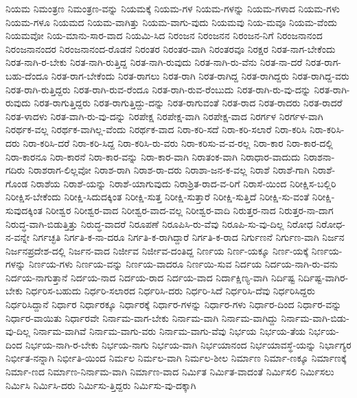 {ನಿಯಮ
ನಿಮಂತ್ರಣ
ನಿಮಂತ್ರಣ-ವನ್ನು
ನಿಯಮಕ್ಕೆ
ನಿಯಮ-ಗಳ
ನಿಯಮ-ಗಳನ್ನು
ನಿಯಮ-ಗಳಾದ
ನಿಯಮ-ಗಳು
ನಿಯಮ-ಗಳೂ
ನಿಯಮದ
ನಿಯಮ-ವಾಗಿತ್ತು
ನಿಯಮ-ವಾಗು-ವುದು
ನಿಯಮವು
ನಿಯ-ಮವೂ
ನಿಯಮ-ವೆಂದು
ನಿಯಮವೋ
ನಿಯ-ಮಾನು-ಸಾರ-ವಾದ
ನಿಯಮಿ-ಸಿದ
ನಿರಂಜನ
ನಿರಂಜನನ
ನಿರಂಜನ-ನಿಗೆ
ನಿರಂಜನಾನಂದ
ನಿರಂಜನಾನಂದರ
ನಿರಂಜನಾನಂದ-ರೊಡನೆ
ನಿರಂತರ
ನಿರಂತರ-ವಾಗಿ
ನಿರಂತರವೂ
ನಿರಕ್ಷರ
ನಿರತ-ನಾಗ-ಬೇಕೆಂದು
ನಿರತ-ನಾಗಿ-ರ-ಬೇಕು
ನಿರತ-ನಾಗಿ-ರುತ್ತಿದ್ದ
ನಿರತ-ನಾಗಿ-ರುವುದು
ನಿರತ-ನಾಗಿ-ರು-ವೆನು
ನಿರತ-ನಾ-ದರೆ
ನಿರತ-ರಾಗ-ಬಹು-ದೆಂದೂ
ನಿರತ-ರಾಗ-ಬೇಕೆಂದು
ನಿರತ-ರಾಗಲು
ನಿರತ-ರಾಗಿ
ನಿರತ-ರಾಗಿದ್ದ
ನಿರತ-ರಾಗಿದ್ದರು
ನಿರತ-ರಾಗಿದ್ದ-ವರು
ನಿರತ-ರಾಗಿ-ರುತ್ತಿದ್ದರು
ನಿರತ-ರಾಗಿ-ರುವ-ರೆಂದೂ
ನಿರತ-ರಾಗಿ-ರುವ-ರೆಂಬುದು
ನಿರತ-ರಾಗಿ-ರು-ವು-ದನ್ನು
ನಿರತ-ರಾಗಿ-ರುವುದು
ನಿರತ-ರಾಗುತ್ತಿದ್ದರು
ನಿರತ-ರಾಗುತ್ತಿದ್ದು-ದನ್ನು
ನಿರತ-ರಾಗುವಂತೆ
ನಿರತ-ರಾದ
ನಿರತ-ರಾದರು
ನಿರತ-ರಾದರೆ
ನಿರತ-ಳಾದಳು
ನಿರತ-ವಾಗಿ-ರು-ವು-ದನ್ನು
ನಿರಪೇಕ್ಷ
ನಿರಪೇಕ್ಷ-ವಾಗಿ
ನಿರಪೇಕ್ಷ-ವಾದ
ನಿರರ್ಗಳ
ನಿರರ್ಗಳ-ವಾಗಿ
ನಿರರ್ಥಕ-ವಲ್ಲ
ನಿರರ್ಥಕ-ವಾಗಿಲ್ಲ-ವೆಂದು
ನಿರರ್ಥಕ-ವಾದ
ನಿರಾ-ಕರಿ-ಸದೆ
ನಿರಾ-ಕರಿ-ಸಲಾರೆ
ನಿರಾ-ಕರಿಸಿ
ನಿರಾ-ಕರಿಸಿ-ದರು
ನಿರಾ-ಕರಿಸಿ-ದರೆ
ನಿರಾ-ಕರಿ-ಸಿದ್ದ
ನಿರಾ-ಕರಿಸಿ-ರು-ವರು
ನಿರಾ-ಕರಿಸು-ವ-ವ-ರಲ್ಲ
ನಿರಾ-ಕಾರ
ನಿರಾ-ಕಾರ-ದಲ್ಲಿ
ನಿರಾ-ಕಾರನೂ
ನಿರಾ-ಕಾರನೆ
ನಿರಾ-ಕಾರ-ವನ್ನು
ನಿರಾ-ಕಾರ-ವಾಗಿ
ನಿರಾತಂಕ-ವಾಗಿ
ನಿರಾಧಾರ-ವಾದುದು
ನಿರಾಶನಾ-ಗದಿರು
ನಿರಾಶರಾಗ-ಲಿಲ್ಲವೋ
ನಿರಾಶ-ರಾಗಿ
ನಿರಾಶ-ರಾ-ದರು
ನಿರಾಶಾ-ಜನ-ಕ-ವಲ್ಲ
ನಿರಾಶೆ
ನಿರಾಶೆ-ಗಾಗಿ
ನಿರಾಶೆ-ಗೊಂಡ
ನಿರಾಶೆಯ
ನಿರಾಶೆ-ಯನ್ನು
ನಿರಾಶೆ-ಯಾಗುವುದು
ನಿರಾಶ್ರಿತ-ರಾದ-ವ-ರಿಗೆ
ನಿರಾಸೆ-ಯಿಂದ
ನಿರೀಕ್ಷಿಸ-ಬಲ್ಲಿರಿ
ನಿರೀಕ್ಷಿಸ-ಬೇಕೆಂದು
ನಿರೀಕ್ಷಿ-ಸಿದುದಕ್ಕಿಂತ
ನಿರೀಕ್ಷಿ-ಸುತ್ತ
ನಿರೀಕ್ಷಿ-ಸುತ್ತಾರೆ
ನಿರೀಕ್ಷಿ-ಸುತ್ತಿದೆ
ನಿರೀಕ್ಷಿ-ಸು-ವಂತೆ
ನಿರೀಕ್ಷಿ-ಸುವುದಕ್ಕಿಂತ
ನಿರೀಶ್ವರ
ನಿರೀಶ್ವರ-ವಾದ
ನಿರೀಶ್ವರ-ವಾದ-ವಲ್ಲ
ನಿರೀಶ್ವರ-ವಾದಿ
ನಿರುತ್ತರ-ನಾದ
ನಿರುತ್ತರ-ನಾ-ದಾಗ
ನಿರುದ್ಧ-ವಾಗಿ-ಬಿಡುತ್ತಿತ್ತು
ನಿರುದ್ಧ-ವಾದರೆ
ನಿರೂಪಣೆ
ನಿರೂಪಿಸಿ-ರು-ವೆವು
ನಿರೂಪಿ-ಸು-ವು-ದಿಲ್ಲ
ನಿರೋಧ
ನಿರೋಧ-ನ-ವನ್ನೇ
ನಿರ್ಗಚ್ಛತಿ
ನಿರ್ಗತಿ-ಕ-ನಾ-ದರೂ
ನಿರ್ಗತಿ-ಕ-ರಾಗಿದ್ದಾರೆ
ನಿರ್ಗತಿ-ಕ-ರಾದ
ನಿರ್ಗುಣನೆ
ನಿರ್ಗುಣ-ವಾಗಿ
ನಿರ್ಜನ
ನಿರ್ಜನಪ್ರದೇಶ-ದಲ್ಲಿ
ನಿರ್ಜನ-ವಾದ
ನಿರ್ಜೀವ
ನಿರ್ಜೀವ-ದಂತಿದ್ದ
ನಿರ್ಣಯ
ನಿರ್ಣ-ಯಕ್ಕೂ
ನಿರ್ಣ-ಯಕ್ಕೆ
ನಿರ್ಣಯ-ಗಳನ್ನು
ನಿರ್ಣಯ-ಗಳು
ನಿರ್ಣಯ-ವನ್ನು
ನಿರ್ಣಯ-ವಾದರೂ
ನಿರ್ಣಯಿ-ಸುವ
ನಿರ್ದಯ
ನಿರ್ದಯ-ನಾಗಿ-ರು-ವನು
ನಿರ್ದಯ-ನಾಗುತ್ತಾನೆ
ನಿರ್ದಯ-ನಾದ
ನಿರ್ದಯ-ರಾದ
ನಿರ್ದಯ-ವಾದ
ನಿರ್ದಾಕ್ಷಿಣ್ಯ-ವಾಗಿ
ನಿರ್ದಿಷ್ಟ
ನಿರ್ದಿಷ್ಟ-ವಾಗಿರ-ಬೇಕು
ನಿರ್ಧರಿಸ-ಬಹುದು
ನಿರ್ಧರಿ-ಸಲಾರದ
ನಿರ್ಧರಿಸಿ-ದರು
ನಿರ್ಧರಿ-ಸಿದೆ
ನಿರ್ಧರಿಸಿ-ದೆವು
ನಿರ್ಧರಿಸಿದ್ದರು
ನಿರ್ಧರಿಸಿದ್ದಾನೆ
ನಿರ್ಧಾರ
ನಿರ್ಧಾರಕ್ಕೂ
ನಿರ್ಧಾರಕ್ಕೆ
ನಿರ್ಧಾರ-ಗಳನ್ನು
ನಿರ್ಧಾರ-ಗಳು
ನಿರ್ಧಾರ-ದಿಂದ
ನಿರ್ಧಾರ-ವನ್ನು
ನಿರ್ಧಾರ-ವಾಯಿತು
ನಿರ್ಧಾರವೇ
ನಿರ್ನಾಮ-ವಾಗ-ಬೇಕು
ನಿರ್ನಾಮ-ವಾಗಿ
ನಿರ್ನಾಮ-ವಾಗಿದ್ದು
ನಿರ್ನಾಮ-ವಾಗಿ-ಬಿಡು-ವು-ದಿಲ್ಲ
ನಿರ್ನಾಮ-ವಾಗಿವೆ
ನಿರ್ನಾಮ-ವಾಗು-ವರು
ನಿರ್ನಾಮ-ವಾಗು-ವೆವು
ನಿರ್ಭಯ
ನಿರ್ಭಯ-ತೆಯ
ನಿರ್ಭಯ-ದಿಂದ
ನಿರ್ಭಯ-ನಾಗಿ-ರ-ಬೇಕು
ನಿರ್ಭಯ-ನಾಗು
ನಿರ್ಭಯ-ವಾಗಿ
ನಿರ್ಭಯಾನಂದ
ನಿರ್ಭಯಾವಸ್ಥೆ-ಯನ್ನು
ನಿರ್ಭಾಗ್ಯರ
ನಿರ್ಭೀತ-ನನ್ನಾಗಿ
ನಿರ್ಭೀತಿ-ಯಿಂದ
ನಿರ್ಮಲ
ನಿರ್ಮಲ-ವಾಗಿ
ನಿರ್ಮಲ-ಶೀಲ
ನಿರ್ಮಾಣ
ನಿರ್ಮಾ-ಣಕ್ಕೂ
ನಿರ್ಮಾಣಕ್ಕೆ
ನಿರ್ಮಾ-ಣದ
ನಿರ್ಮಾಣ-ನಿರ್ನಾಮ-ವಾಗಿ
ನಿರ್ಮಾಣ-ವಾದ
ನಿರ್ಮಿತ
ನಿರ್ಮಿತ-ವಾದಂತೆ
ನಿರ್ಮಿಸಲಿ
ನಿರ್ಮಿಸಲು
ನಿರ್ಮಿಸಿ
ನಿರ್ಮಿಸಿ-ದರು
ನಿರ್ಮಿಸು-ತ್ತಿದ್ದರು
ನಿರ್ಮಿಸು-ವು-ದಕ್ಕಾಗಿ
}
